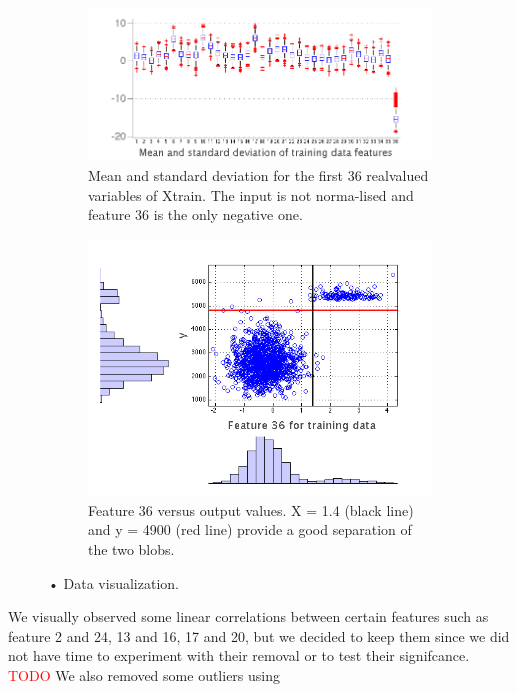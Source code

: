 \documentclass{article} %
\begin{document}
\begin{figure}[h]
  \begin{subfigure}[b]{0.5\textwidth}
   \includegraphics[width=\textwidth]{figures/dist_regression.png}
    \caption{Mean and standard deviation for the first 36 real\newline valued variables of Xtrain. The input is not norma-\newline lised and feature 36 is the only negative one.}
    \label{fig:dist_regression}
  \end{subfigure}
  \begin{subfigure}[b]{0.5\textwidth}
    \includegraphics[width=\textwidth]{figures/feature36.png}
    \caption{Feature 36 versus output values. X = 1.4 (black line) and y = 4900 (red line)  provide a good separation of the two blobs.}
    \label{fig:feature36}
  \end{subfigure}
  \caption{• Data visualization. }
\end{figure}

We visually observed some linear correlations between certain features such as feature 2 and 24, 13 and 16, 17 and 20, but we decided to keep them since we did not have time to experiment with their removal or to test their signifcance.
\textcolor{red}{TODO} We also removed some outliers using
\end{document}
